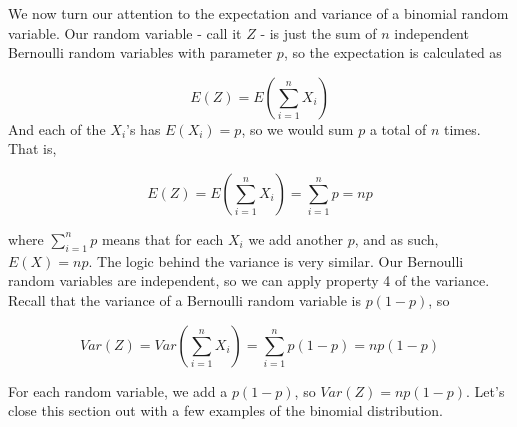\documentclass[
]{book}
\theoremstyle{definition}
\theoremstyle{definition}
\theoremstyle{definition}
\theoremstyle{definition}
\theoremstyle{remark}
\begin{document}
We now turn our attention to the expectation and variance of a binomial random variable. Our random variable - call it \(Z\) - is just the sum of \(n\) independent Bernoulli random variables with parameter \(p\), so the expectation is calculated as

\[
E(Z) = E(\sum_{i=1}^{n}X_i)
\]
And each of the \(X_i\)'s has \(E(X_i) = p\), so we would sum \(p\) a total of \(n\) times. That is,

\[
E(Z) = E(\sum_{i=1}^{n}X_i) = \sum_{i=1}^{n}p = np
\label{eq:binomexpectation}
\]

where \(\sum_{i=1}^{n}p\) means that for each \(X_i\) we add another \(p\), and as such, \(E(X) = np\). The logic behind the variance is very similar. Our Bernoulli random variables are independent, so we can apply property 4 of the variance. Recall that the variance of a Bernoulli random variable is \(p(1-p)\), so

\[
Var(Z) = Var(\sum_{i=1}^{n}X_i) = \sum_{i=1}^{n}p(1-p) = np(1-p)
\label{eq:binomvariance}
\]

For each random variable, we add a \(p(1-p)\), so \(Var(Z) = np(1-p)\). Let's close this section out with a few examples of the binomial distribution.
\end{document}
